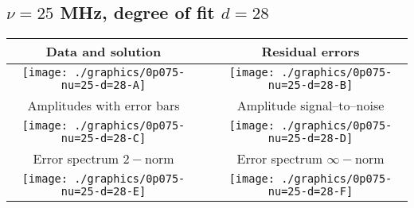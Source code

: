 

% 

\clearpage{}
\break{}

\subsection{$\nu = 25$ MHz, degree of fit $d = 28$}

\begin{table}[h]
    \begin{center}
        \begin{tabular}{ccc}
            Data and solution & \quad & Residual errors \\\hline
            \texttt{[image: ./graphics/0p075-nu=25-d=28-A]} &&
            \texttt{[image: ./graphics/0p075-nu=25-d=28-B]} \\[15pt]
            Amplitudes with error bars && Amplitude signal--to--noise \\\hline
            \texttt{[image: ./graphics/0p075-nu=25-d=28-C]} &&
            \texttt{[image: ./graphics/0p075-nu=25-d=28-D]} \\[15pt]
            Error spectrum $2-$norm && Error spectrum $\infty-$norm \\\hline
            \texttt{[image: ./graphics/0p075-nu=25-d=28-E]} &&
            \texttt{[image: ./graphics/0p075-nu=25-d=28-F]} \\[15pt]
        \end{tabular}
    \end{center}
\label{fig:elev=75, nu=25}
\end{table}



\endinput
